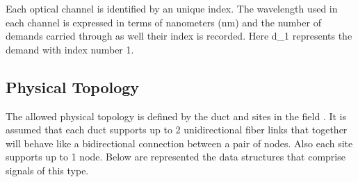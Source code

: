 \begin{table}[H]
	\centering
	\caption{Structure of an "Optical Channel" variable.}
	\label{opticalChannels}
\end{table}

Each optical channel is identified by an unique index. The wavelength used in each channel is expressed in terms of nanometers (nm) and the number of demands carried through as well their index is recorded. Here d\_1 represents the demand with index number 1.

\subsection{Physical Topology}

 The allowed physical topology is defined by the duct and sites in the field \cite{TiagoEsteves}. It is assumed that each duct supports up to 2 unidirectional fiber links that together will behave like a bidirectional connection between a pair of nodes. Also each site supports up to 1 node. Below are represented the data structures that comprise signals of this type.

